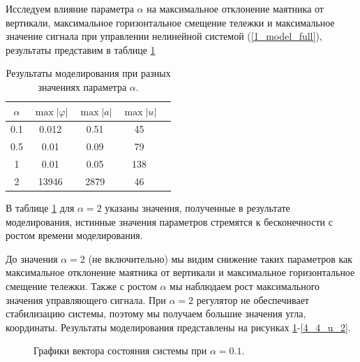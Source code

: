 Исследуем влияние параметра $\alpha$ на максимальное отклонение маятника от вертикали, максимальное горизонтальное смещение тележки и максимальное значение сигнала при управлении нелинейной системой (\ref{1_model_full}), результаты представим в таблице \ref{4_tab_4}


\begin{table}[h]
\centering
\caption{Результаты моделирования при разных значениях параметра $\alpha$.}
\label{4_tab_4}
\begin{tabular}{ccccc}
\toprule
$\alpha$ & $\max |\varphi|$ & $\max |a|$ & $\max |u|$ \\
\midrule
0.1  &  0.012  &  0.51  &  45 \\
0.5  &  0.01  &  0.09  &   79 \\
1 &  0.01  &  0.05  &  138  \\
2  &  13946  &  2879 &   46 \\
\bottomrule
\end{tabular}
\end{table}

В таблице \ref{4_tab_4} для $\alpha=2$ указаны значения, полученные в результате моделирования, истинные значения параметров стремятся к бесконечности с ростом времени моделирования.

До значения $\alpha=2$ (не включительно) мы видим снижение таких параметров как максимальное отклонение маятника от вертикали и максимальное горизонтальное смещение тележки. Также с ростом $\alpha$ мы наблюдаем рост максимального значения управляющего сигнала. При $\alpha=2$ регулятор не обеспечивает стабилизацию системы, поэтому мы получаем большие значения угла, координаты. Результаты моделирования представлены на рисунках \ref{4_4_x_01}-\ref{4_4_u_2}.

\begin{figure}[!h]
	\caption{Графики вектора состояния системы при $\alpha = 0.1$.}
	\label{4_4_x_01}
\end{figure}


